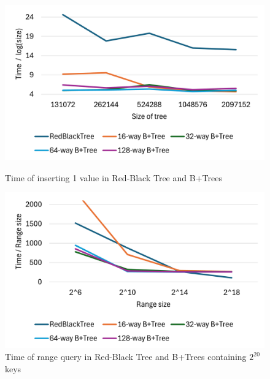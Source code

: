 \documentclass[twoside,11pt]{report}
\theoremstyle{definition}
\begin{document}
\newpage
{}
\begin{figure}[htbp]
  \centering
  \begin{minipage}[b]{0.49\textwidth}
    \centering
    \includegraphics[width=\textwidth]{asset/insert.png}
    \captionsetup{width=0.9\textwidth}
    \caption{Time of inserting 1 value in Red-Black Tree and B+Trees}
    \label{fig:insert_BPlusTree}
  \end{minipage}
  \begin{minipage}[b]{0.49\textwidth}
    \centering
    \includegraphics[width=\textwidth]{asset/range_query.png}
    \captionsetup{width=0.9\textwidth}
    \caption{Time of range query in Red-Black Tree and B+Trees containing $2^{20}$ keys}
    \label{fig:rq_BPlusTree}
  \end{minipage}

  \vspace{0.5cm}


\end{figure}
\end{document}
